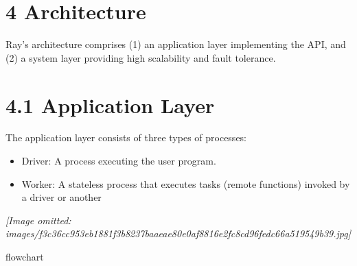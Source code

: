 \documentclass[
]{article}
\providecommand{\tightlist}{%
  \setlength{\itemsep}{0pt}\setlength{\parskip}{0pt}}
\begin{document}
\section{4 Architecture}\label{architecture}

Ray's architecture comprises (1) an application layer implementing the
API, and (2) a system layer providing high scalability and fault
tolerance.

\section{4.1 Application Layer}\label{application-layer}

The application layer consists of three types of processes:

\begin{itemize}
\tightlist
\item
  Driver: A process executing the user program.\\
\item
  Worker: A stateless process that executes tasks (remote functions)
  invoked by a driver or another
\end{itemize}

\textit{[Image omitted: images/f3c36cc953eb1881f3b8237baaeae80e0af8816e2fc8cd96fedc66a519549b39.jpg]}

flowchart
\end{document}
